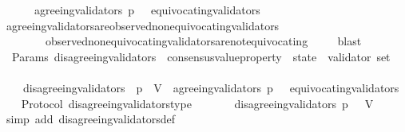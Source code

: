 \begin{isabellebody}
\ \ {\isachardoublequoteopen}{\isasymforall}\ {\isasymsigma}\ {\isasymin}\ {\isasymSigma}{\isachardot}\ agreeing{\isacharunderscore}validators\ {\isacharparenleft}p{\isacharcomma}\ {\isasymsigma}{\isacharparenright}\ {\isasyminter}\ equivocating{\isacharunderscore}validators\ {\isasymsigma}\ {\isacharequal}\ {\isasymemptyset}{\isachardoublequoteclose}\isanewline
%
\isadelimproof
\ \ %
\endisadelimproof
%
\isatagproof
{}\isamarkupfalse%
\ agreeing{\isacharunderscore}validators{\isacharunderscore}are{\isacharunderscore}observed{\isacharunderscore}non{\isacharunderscore}equivocating{\isacharunderscore}validators\isanewline
\ \ \ \ \ \ \ \ observed{\isacharunderscore}non{\isacharunderscore}equivocating{\isacharunderscore}validators{\isacharunderscore}are{\isacharunderscore}not{\isacharunderscore}equivocating\ \isanewline
\ \ \isamarkupfalse%
\ blast%
\endisatagproof
{\isafoldproof}%
%
\isadelimproof
\isanewline
%
\endisadelimproof
\isanewline
\isanewline
{}\isamarkupfalse%
\ {\isacharparenleft}\ Params{\isacharparenright}\ disagreeing{\isacharunderscore}validators\ {\isacharcolon}{\isacharcolon}\ {\isachardoublequoteopen}{\isacharparenleft}consensus{\isacharunderscore}value{\isacharunderscore}property\ {\isacharasterisk}\ state{\isacharparenright}\ {\isasymRightarrow}\ validator\ set{\isachardoublequoteclose}\isanewline
\ \ \isanewline
\ \ \ \ {\isachardoublequoteopen}disagreeing{\isacharunderscore}validators\ {\isacharequal}\ {\isacharparenleft}{\isasymlambda}{\isacharparenleft}p{\isacharcomma}\ {\isasymsigma}{\isacharparenright}{\isachardot}\ V\ {\isacharminus}\ agreeing{\isacharunderscore}validators\ {\isacharparenleft}p{\isacharcomma}\ {\isasymsigma}{\isacharparenright}\ {\isacharminus}\ equivocating{\isacharunderscore}validators\ {\isasymsigma}{\isacharparenright}{\isachardoublequoteclose}\isanewline
\isanewline
{}\isamarkupfalse%
\ {\isacharparenleft}\ Protocol{\isacharparenright}\ disagreeing{\isacharunderscore}validators{\isacharunderscore}type\ {\isacharcolon}\isanewline
\ \ {\isachardoublequoteopen}{\isasymforall}\ {\isasymsigma}\ {\isasymin}\ {\isasymSigma}{\isachardot}\ disagreeing{\isacharunderscore}validators\ {\isacharparenleft}p{\isacharcomma}\ {\isasymsigma}{\isacharparenright}\ {\isasymsubseteq}\ V{\isachardoublequoteclose}\isanewline
%
\isadelimproof
\ \ %
\endisadelimproof
%
\isatagproof
{}\isamarkupfalse%
\ {\isacharparenleft}simp\ add{\isacharcolon}\ disagreeing{\isacharunderscore}validators{\isacharunderscore}def{\isacharparenright}\isanewline

\end{isabellebody}
